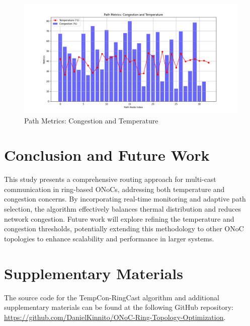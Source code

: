 \documentclass[conference]{IEEEtran}
\begin{document}
\begin{figure}[h]
    \centering
    \includegraphics[width=\linewidth]{path_metrics.png}
    \caption{Path Metrics: Congestion and Temperature}
    \label{fig:path_metrics}
\end{figure}

\section{Conclusion and Future Work}
This study presents a comprehensive routing approach for multi-cast communication in ring-based ONoCs, addressing both temperature and congestion concerns. By incorporating real-time monitoring and adaptive path selection, the algorithm effectively balances thermal distribution and reduces network congestion. Future work will explore refining the temperature and congestion thresholds, potentially extending this methodology to other ONoC topologies to enhance scalability and performance in larger systems.

\appendices
\section{Supplementary Materials}
The source code for the TempCon-RingCast algorithm and additional supplementary materials can be found at the following GitHub repository: \href{https://github.com/DanielKinnito/ONoC-Ring-Topology-Optimization}{https://github.com/DanielKinnito/ONoC-Ring-Topology-Optimization}.



\end{document}
